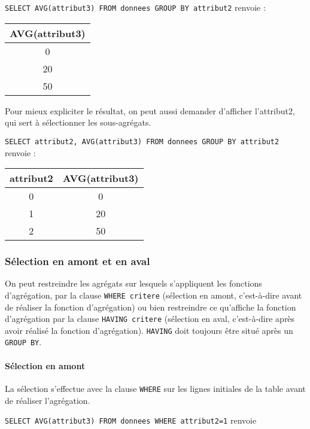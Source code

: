 \verb|SELECT AVG(attribut3) FROM donnees GROUP BY attribut2| renvoie : 

\begin{center}
\begin{tabular}{|c|}\hline
AVG(attribut3)\\\hline
0 \\\hline
20 \\\hline
50 \\\hline
\end{tabular}
\end{center}

Pour mieux expliciter le résultat, on peut aussi demander d'afficher l'attribut2, qui sert à sélectionner les sous-agrégats.

\verb|SELECT attribut2, AVG(attribut3) FROM donnees GROUP BY attribut2| renvoie : 

\begin{center}
\begin{tabular}{|c|c|}\hline
attribut2 & AVG(attribut3)\\\hline
0 & 0 \\\hline
1 & 20 \\\hline
2 & 50 \\\hline
\end{tabular}
\end{center}

\subsubsection{Sélection en amont et en aval}

On peut restreindre les agrégats sur lesquels s'appliquent les fonctions d'agrégation, par la clause \verb|WHERE critere| (sélection en amont, c'est-à-dire avant de réaliser la fonction d'agrégation) ou bien restreindre ce qu'affiche la fonction d'agrégation par la clause \verb|HAVING critere| (sélection en aval, c'est-à-dire après avoir réalisé la fonction d'agrégation). \verb|HAVING| doit toujours être situé après un \verb|GROUP BY|.

\paragraph{Sélection en amont}

La sélection s'effectue avec la clause \verb|WHERE| sur les lignes initiales de la table avant de réaliser l'agrégation.

\verb|SELECT AVG(attribut3) FROM donnees WHERE attribut2=1| renvoie 

